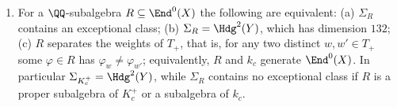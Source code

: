 \begin{proposition}
\begin{enumerate}[label=\textup{(\roman*)},leftmargin=2.6em,itemsep=2pt]
  every homomorphism $Y\to X$ is of this form. For a $\QQ$-subalgebra
  $R\subseteq\End^{0}(X)$ let $\Sigma_{R}\subseteq\Hdg^{2}(Y)$ be the
  $\QQ$-span of the products of two divisor classes of $Y$ and of the classes
  $f_{\varphi,\psi}^{*}\HW(X)$ with $\varphi,\psi\in R$. Then
  $\Sigma_{k_{c}}=\Sigma_{\QQ}$, the span obtained from the maps
  $(x,y)\mapsto ax+by$ alone, has dimension $110$ and meets the span of
  $\pi_{0},\pi_{12},\pi_{13},\pi_{23}$ in the plane of the classes with
  $a_{1}=a_{2}=a_{3}$; it contains no exceptional class.
\item For a $\QQ$-subalgebra $R\subseteq\End^{0}(X)$ the following are
  equivalent: \textup{(a)} $\Sigma_{R}$ contains an exceptional class;
  \textup{(b)} $\Sigma_{R}=\Hdg^{2}(Y)$, which has dimension $132$;
  \textup{(c)} $R$ separates the weights of $T_{+}$, that is, for any two
  distinct $w,w'\in T_{+}$ some $\varphi\in R$ has
  $\varphi_{w}\ne\varphi_{w'}$; equivalently, $R$ and $k_{c}$ generate
  $\End^{0}(X)$. In particular $\Sigma_{K_{c}^{+}}=\Hdg^{2}(Y)$, while
  $\Sigma_{R}$ contains no exceptional class if $R$ is a proper subalgebra
  of $K_{c}^{+}$ or a subalgebra of $k_{c}$.
\end{enumerate}
\end{proposition}

